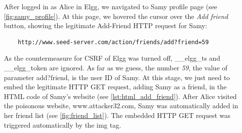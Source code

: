 After logged in as Alice in Elgg, we navigated to Samy profile page (see \autoref{fig:samy_profile}).
At this page, we hovered the cursor over the \emph{Add friend} button, showing the
legitimate Add-Friend HTTP request for Samy:

\begin{verbatim}
    http://www.seed-server.com/action/friends/add?friend=59
\end{verbatim}

As the countermeasure for CSRF
of Elgg was turned off, {\selectfont \_\_elgg\_ts} and {\selectfont
\_\_elgg\_token} are ignored. As far as we guess, the number \emph{59}, the value of parameter
{\selectfont add?friend}, is the user ID of Samy. At this stage, we just need
to embed the legitimate HTTP GET request, adding Samy as a friend, in the HTML code of Samy's
website (see \autoref{lst:html_add_friend}). After Alice visited the poisonous website,
{\selectfont www.attacker32.com}, Samy was automatically added in her friend
list (see \autoref{fig:friend_list}). The embedded HTTP GET request was triggered automatically
by the {\selectfont img} tag.